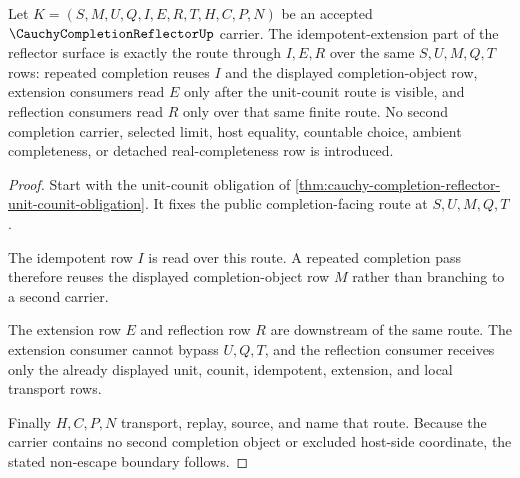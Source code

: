 \begin{theorem}
\label{thm:cauchy-completion-reflector-idempotent-extension-obligation}
Let $K=(S,M,U,Q,I,E,R,T,H,C,P,N)$ be an accepted $\CauchyCompletionReflectorUp$ carrier. The idempotent-extension part of the reflector surface is exactly the route through $I,E,R$ over the same $S,U,M,Q,T$ rows: repeated completion reuses $I$ and the displayed completion-object row, extension consumers read $E$ only after the unit-counit route is visible, and reflection consumers read $R$ only over that same finite route. No second completion carrier, selected limit, host equality, countable choice, ambient completeness, or detached real-completeness row is introduced.
\end{theorem}
\begin{proof}
Start with the unit-counit obligation of \autoref{thm:cauchy-completion-reflector-unit-counit-obligation}. It fixes the public completion-facing route at $S,U,M,Q,T$.

The idempotent row $I$ is read over this route. A repeated completion pass therefore reuses the displayed completion-object row $M$ rather than branching to a second carrier.

The extension row $E$ and reflection row $R$ are downstream of the same route. The extension consumer cannot bypass $U,Q,T$, and the reflection consumer receives only the already displayed unit, counit, idempotent, extension, and local transport rows.

Finally $H,C,P,N$ transport, replay, source, and name that route. Because the carrier contains no second completion object or excluded host-side coordinate, the stated non-escape boundary follows.
\end{proof}

